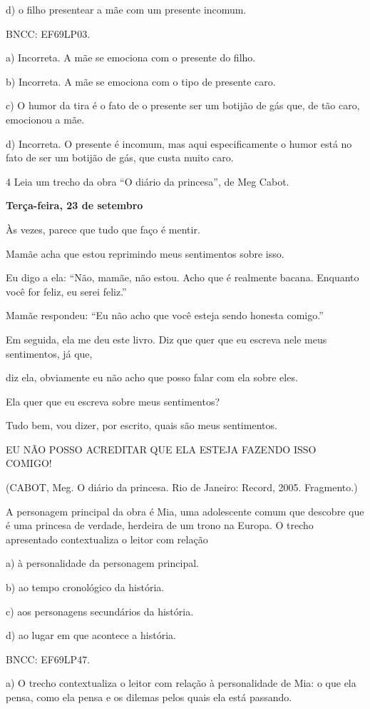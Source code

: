 d) o filho presentear a mãe com um presente incomum.

BNCC: EF69LP03.

a) Incorreta. A mãe se emociona com o presente do filho.

b) Incorreta. A mãe se emociona com o tipo de presente caro.

c) O humor da tira é o fato de o presente ser um botijão de gás que, de
tão caro, emocionou a mãe.

d) Incorreta. O presente é incomum, mas aqui especificamente o humor
está no fato de ser um botijão de gás, que custa muito caro.

\num{4} Leia um trecho da obra ``O diário da princesa'', de Meg Cabot.

\textbf{Terça-feira, 23 de setembro}

Às vezes, parece que tudo que faço é mentir.

Mamãe acha que estou reprimindo meus sentimentos sobre isso.

Eu digo a ela: ``Não, mamãe, não estou. Acho que é realmente bacana.
Enquanto você for feliz, eu serei feliz.''

Mamãe respondeu: ``Eu não acho que você esteja sendo honesta comigo.''

Em seguida, ela me deu este livro. Diz que quer que eu escreva nele meus
sentimentos, já que,

diz ela, obviamente eu não acho que posso falar com ela sobre eles.

Ela quer que eu escreva sobre meus sentimentos?

Tudo bem, vou dizer, por escrito, quais são meus sentimentos.

EU NÃO POSSO ACREDITAR QUE ELA ESTEJA FAZENDO ISSO COMIGO!

(CABOT, Meg. O diário da princesa. Rio de Janeiro: Record, 2005.
Fragmento.)

A personagem principal da obra é Mia, uma adolescente comum que descobre
que é uma princesa de verdade, herdeira de um trono na Europa. O trecho
apresentado contextualiza o leitor com relação

a) à personalidade da personagem principal.

b) ao tempo cronológico da história.

c) aos personagens secundários da história.

d) ao lugar em que acontece a história.

BNCC: EF69LP47.

a) O trecho contextualiza o leitor com relação à personalidade de Mia: o
que ela pensa, como ela pensa e os dilemas pelos quais ela está
passando.

